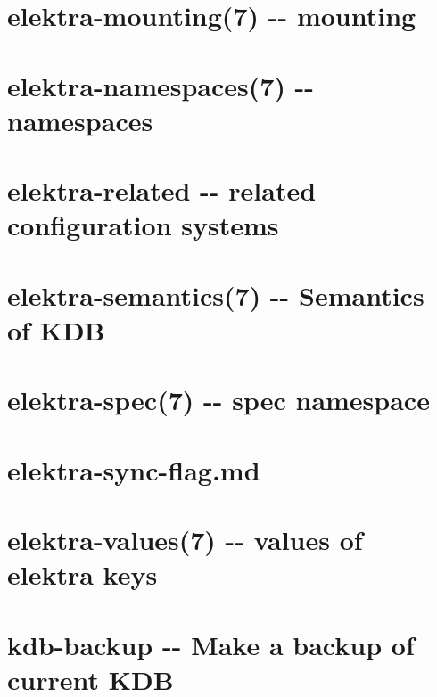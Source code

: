 \documentclass[twoside]{book}
\newcommand{\+}{\discretionary{\mbox{\scriptsize$\hookleftarrow$}}{}{}}
\begin{document}
\chapter{elektra-\/mounting(7) -\/-\/ mounting}
\label{md_doc_help_elektra-mounting}

\chapter{elektra-\/namespaces(7) -\/-\/ namespaces}
\label{md_doc_help_elektra-namespaces}

\chapter{elektra-\/related -\/-\/ related configuration systems}
\label{md_doc_help_elektra-related}

\chapter{elektra-\/semantics(7) -\/-\/ Semantics of K\+DB}
\label{md_doc_help_elektra-semantics}

\chapter{elektra-\/spec(7) -\/-\/ spec namespace}
\label{md_doc_help_elektra-spec}

\chapter{elektra-\/sync-\/flag.md}
\label{doc_help_elektra-sync-flag_md}

\chapter{elektra-\/values(7) -\/-\/ values of elektra keys}
\label{md_doc_help_elektra-values}

\chapter{kdb-\/backup -\/-\/ Make a backup of current K\+DB}
\label{md_doc_help_kdb-backup}

\end{document}
